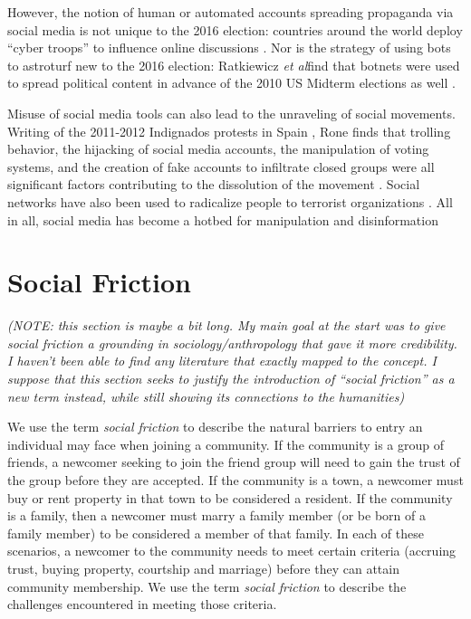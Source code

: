 \documentclass[sigconf,authordraft]{acmart}
\newcommand{\etal}{{\itshape et al}}
\begin{document}
However, the notion of human or automated accounts spreading propaganda via social media is not unique to the 2016 election: countries around the world deploy ``cyber troops'' to influence online discussions \cite{bradshaw2017troops}. Nor is the strategy of using bots to astroturf new to the 2016 election: Ratkiewicz \etal find that botnets were used to spread political content in advance of the 2010 US Midterm elections as well \cite{ratkiewicz2011truthy}.

Misuse of social media tools can also lead to the unraveling of social movements. Writing of the 2011-2012 Indignados protests in Spain \cite{indignadosBBC}, Rone finds that trolling behavior, the hijacking of social media accounts, the manipulation of voting systems, and the creation of fake accounts to infiltrate closed groups were all significant factors contributing to the dissolution of the movement \cite{rone2019fake}. Social networks have also been used to radicalize people to terrorist organizations \cite{o2007virtual,Torok2016SocialMA}. All in all, social media has become a hotbed for manipulation and disinformation \cite{benkler2018network}



\section{Social Friction}

\textit{(NOTE: this section is maybe a bit long. My main goal at the start was to give social friction a grounding in sociology/anthropology that gave it more credibility. I haven't been able to find any literature that exactly mapped to the concept. I suppose that this section seeks to justify the introduction of ``social friction'' as a new term instead, while still showing its connections to the humanities)}

We use the term {\itshape social friction} to describe the natural barriers to entry an individual may face when joining a community. If the community is a group of friends, a newcomer seeking to join the friend group will need to gain the trust of the group before they are accepted. If the community is a town, a newcomer must buy or rent property in that town to be considered a resident. If the community is a family, then a newcomer must marry a family member (or be born of a family member) to be considered a member of that family. In each of these scenarios, a newcomer to the community needs to meet certain criteria (accruing trust, buying property, courtship and marriage) before they can attain community membership. We use the term {\itshape social friction} to describe the challenges encountered in meeting those criteria. 
\end{document}
